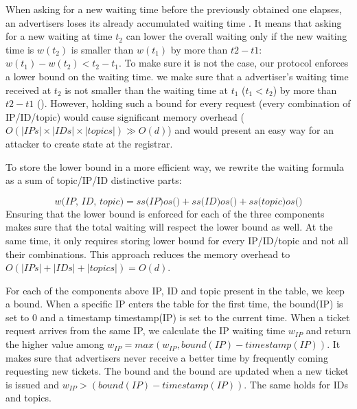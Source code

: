 When asking for a new waiting time before the previously obtained one elapses, an advertisers loses its already accumulated waiting time . It means that asking for a new waiting at time $t_2$ can lower the overall waiting only if the new waiting time is $w(t_2)$ is smaller than $w(t_1)$ by more than $t2 - t1$: $w(t_1) - w(t_2) < t_2 - t_1$.
To make sure it is not the case,  our protocol enforces a lower bound on the waiting time. \Ie we make sure that a advertiser's waiting time received at $t_2$ is not smaller than the waiting time at $t_1$ ($t_1 < t_2$) by more than $t2 - t1$ (). 
However, holding such a bound for every request (\ie every combination of IP/ID/topic) would cause significant memory overhead ($O(|IPs|\times|IDs|\times|topics|)  \gg O(d)$) and would present an easy way for an attacker to create state at the registrar. 

To store the lower bound in a more efficient way, we rewrite the waiting formula as a sum of topic/IP/ID distinctive parts:

\begin{equation}
    \textit{w(IP, ID, topic)} = 
    \textit{ss(IP)}\textit{os()} + 
    \textit{ss(ID)}\textit{os()} + 
    \textit{ss(topic)}\textit{os()}
\end{equation}
Ensuring that the lower bound is enforced for each of the three components makes sure that the total waiting will respect the lower bound as well. At the same time, it only requires storing lower bound for every IP/ID/topic and not all their combinations. This approach reduces the memory overhead to $O(|IPs|+|IDs|+|topics|) = O(d)$.

For each of the components above IP, ID and topic present in the table, we keep a bound. When a specific IP enters the table for the first time, the bound(IP) is set to 0 and a timestamp timestamp(IP) is set to the current time. When a ticket request arrives from the same IP, we calculate the IP waiting time $w_{IP}$ and return the higher value among $w_{IP} = max(w_{IP}, bound(IP) - timestamp(IP))$. It makes sure that advertisers never receive a better time by frequently coming requesting new tickets. The bound and the bound are updated when a new ticket is issued and $w_{IP} > (bound(IP) - timestamp(IP))$. The same holds for IDs and topics.


